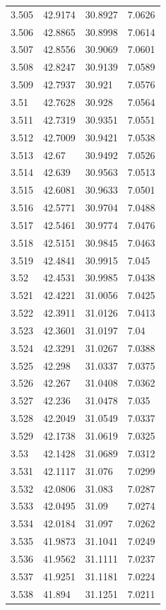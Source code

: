 \begin{tabular}{llll}
3.505 & 42.9174 & 30.8927 & 7.0626 \\
3.506 & 42.8865 & 30.8998 & 7.0614 \\
3.507 & 42.8556 & 30.9069 & 7.0601 \\
3.508 & 42.8247 & 30.9139 & 7.0589 \\
3.509 & 42.7937 & 30.921 & 7.0576 \\
3.51 & 42.7628 & 30.928 & 7.0564 \\
3.511 & 42.7319 & 30.9351 & 7.0551 \\
3.512 & 42.7009 & 30.9421 & 7.0538 \\
3.513 & 42.67 & 30.9492 & 7.0526 \\
3.514 & 42.639 & 30.9563 & 7.0513 \\
3.515 & 42.6081 & 30.9633 & 7.0501 \\
3.516 & 42.5771 & 30.9704 & 7.0488 \\
3.517 & 42.5461 & 30.9774 & 7.0476 \\
3.518 & 42.5151 & 30.9845 & 7.0463 \\
3.519 & 42.4841 & 30.9915 & 7.045 \\
3.52 & 42.4531 & 30.9985 & 7.0438 \\
3.521 & 42.4221 & 31.0056 & 7.0425 \\
3.522 & 42.3911 & 31.0126 & 7.0413 \\
3.523 & 42.3601 & 31.0197 & 7.04 \\
3.524 & 42.3291 & 31.0267 & 7.0388 \\
3.525 & 42.298 & 31.0337 & 7.0375 \\
3.526 & 42.267 & 31.0408 & 7.0362 \\
3.527 & 42.236 & 31.0478 & 7.035 \\
3.528 & 42.2049 & 31.0549 & 7.0337 \\
3.529 & 42.1738 & 31.0619 & 7.0325 \\
3.53 & 42.1428 & 31.0689 & 7.0312 \\
3.531 & 42.1117 & 31.076 & 7.0299 \\
3.532 & 42.0806 & 31.083 & 7.0287 \\
3.533 & 42.0495 & 31.09 & 7.0274 \\
3.534 & 42.0184 & 31.097 & 7.0262 \\
3.535 & 41.9873 & 31.1041 & 7.0249 \\
3.536 & 41.9562 & 31.1111 & 7.0237 \\
3.537 & 41.9251 & 31.1181 & 7.0224 \\
3.538 & 41.894 & 31.1251 & 7.0211 \\

\end{tabular}

